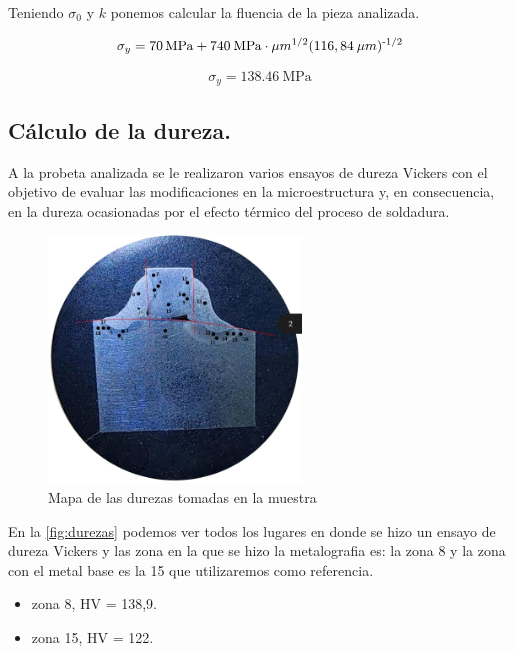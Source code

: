 \documentclass[12pt,a4paper]{article}
\begin{document}
Teniendo $\sigma_0$ y $k$ ponemos calcular la fluencia de la pieza analizada.

\begin{equation}
    \sigma_y = \SI{70}{\mega\pascal} + 740\: \text{MPa}\cdot \mu m\textsuperscript{1/2} (116,84\: \mu m)\textsuperscript{-1/2}
\end{equation}

\begin{equation}
    \sigma_y = \SI{138,46}{\mega\pascal} 
\end{equation}

\subsection{Cálculo de la dureza.}

A la probeta analizada se le realizaron varios ensayos de dureza Vickers con el objetivo de evaluar las modificaciones en la microestructura y, en consecuencia, en la dureza ocasionadas por el efecto térmico del proceso de soldadura.

\begin{figure}[h!] 
    \centering
    \includegraphics[width=0.6\textwidth]{Figuras/mapa_de_durezas.png} 
    \caption{Mapa de las durezas tomadas en la muestra}
    \label{fig:durezas}
\end{figure}

En la \autoref{fig:durezas} podemos ver todos los lugares en donde se hizo un ensayo de dureza Vickers y las zona en la que se hizo la metalografia es: la zona 8 y la zona con el metal base es la 15 que utilizaremos como referencia.

\begin{itemize}
    \item zona 8, HV = 138,9.
    \item zona 15, HV = 122.
\end{itemize}
\end{document}
